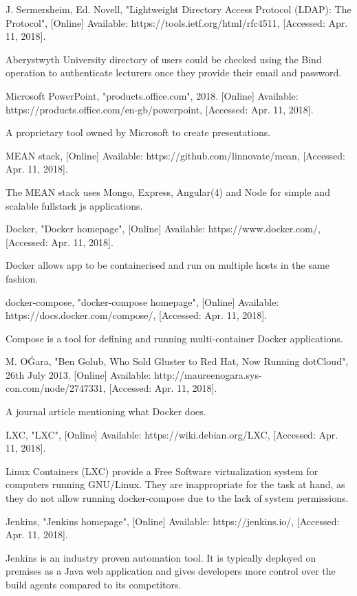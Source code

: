 \documentclass[11pt,a4paper]{report}
\begin{document}
\begin{thebibliography}{1}
 J. Sermersheim, Ed. Novell, "Lightweight Directory Access Protocol (LDAP): The Protocol", [Online]
    Available: https://tools.ietf.org/html/rfc4511, [Accessed: Apr. 11, 2018].

    Aberystwyth University directory of users could be checked using the Bind operation
    to authenticate lecturers once they provide their email and password.

 Microsoft PowerPoint, "products.office.com", 2018. [Online] Available: https://products.office.com/en-gb/powerpoint, [Accessed: Apr. 11, 2018].

  A proprietary tool owned by Microsoft to create presentations.

 MEAN stack, [Online] Available: https://github.com/linnovate/mean, [Accessed: Apr. 11, 2018].

    The MEAN stack uses Mongo, Express, Angular(4) and Node for simple and scalable fullstack js applications.

 Docker, "Docker homepage", [Online] Available: https://www.docker.com/, [Accessed: Apr. 11, 2018].

    Docker allows app to be containerised and run on multiple hosts in the same fashion.

 docker-compose, "docker-compose homepage", [Online] Available: https://docs.docker.com/compose/, [Accessed: Apr. 11, 2018].

    Compose is a tool for defining and running multi-container Docker applications.

  M. O\'Gara, "Ben Golub, Who Sold Gluster to Red Hat, Now Running dotCloud", 26th July 2013.
  [Online] Available: http://maureenogara.sys-con.com/node/2747331, [Accessed: Apr. 11, 2018].

  A journal article mentioning what Docker does.

 LXC, "LXC", [Online] Available: https://wiki.debian.org/LXC, [Accessed: Apr. 11, 2018].

  Linux Containers (LXC) provide a Free Software virtualization system for computers running GNU/Linux. They are inappropriate
  for the task at hand, as they do not allow running docker-compose due to the lack of system permissions.

 Jenkins, "Jenkins homepage", [Online] Available: https://jenkins.io/, [Accessed: Apr. 11, 2018].

  Jenkins is an industry proven automation tool. It is typically deployed
  on premises as a Java web application and gives developers more control over the build agents compared to its
  competitors.


\end{thebibliography}
\end{document}
